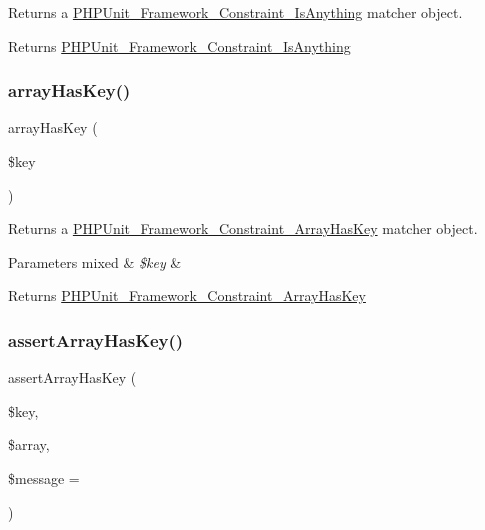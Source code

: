 Returns a \mbox{\hyperlink{class_p_h_p_unit___framework___constraint___is_anything}{P\+H\+P\+Unit\+\_\+\+Framework\+\_\+\+Constraint\+\_\+\+Is\+Anything}} matcher object.

\begin{DoxyReturn}{Returns}
\mbox{\hyperlink{class_p_h_p_unit___framework___constraint___is_anything}{P\+H\+P\+Unit\+\_\+\+Framework\+\_\+\+Constraint\+\_\+\+Is\+Anything}} 
\end{DoxyReturn}
\mbox{\label{_functions_8php_ad508cfb1870b428434bfe9bb80a1342d}} 
\subsubsection{\texorpdfstring{array\+Has\+Key()}{arrayHasKey()}}
{\footnotesize\ttfamily array\+Has\+Key (\begin{DoxyParamCaption}\item[{}]{\$key }\end{DoxyParamCaption})}

Returns a \mbox{\hyperlink{class_p_h_p_unit___framework___constraint___array_has_key}{P\+H\+P\+Unit\+\_\+\+Framework\+\_\+\+Constraint\+\_\+\+Array\+Has\+Key}} matcher object.


\begin{DoxyParams}[1]{Parameters}
mixed & {\em \$key} & \\
\hline
\end{DoxyParams}
\begin{DoxyReturn}{Returns}
\mbox{\hyperlink{class_p_h_p_unit___framework___constraint___array_has_key}{P\+H\+P\+Unit\+\_\+\+Framework\+\_\+\+Constraint\+\_\+\+Array\+Has\+Key}} 
\end{DoxyReturn}
\mbox{\label{_functions_8php_abaec8b6dc06207cc28e4d203ab7bef61}} 
\subsubsection{\texorpdfstring{assert\+Array\+Has\+Key()}{assertArrayHasKey()}}
{\footnotesize\ttfamily assert\+Array\+Has\+Key (\begin{DoxyParamCaption}\item[{}]{\$key,  }\item[{}]{\$array,  }\item[{}]{\$message = {\ttfamily \textquotesingle{}\textquotesingle{}} }\end{DoxyParamCaption})}

